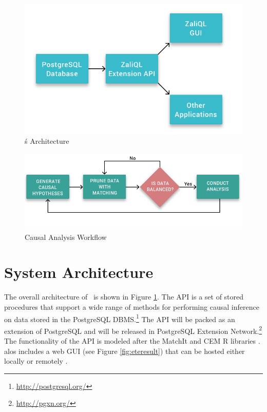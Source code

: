 
\begin{figure}
 \includegraphics[scale=0.25]{Figures/System-Overview.png}
 \caption{\GSQLB\'s Architecture}
  \label{fig:arch}
  \vspace{-3mm}
\end{figure}


\begin{figure}
  \includegraphics[scale=0.25]{Figures/Matching-Flowchart.png}
\caption{Causal Analysis Workflow}
\label{fig:flowchart}
\vspace{-0.3cm}
\end{figure}



\section{System Architecture}

The overall architecture of \GSQL\ is shown in Figure \ref{fig:arch}.
The API is a set of stored procedures that support a wide
range of methods for performing causal inference on data stored in the
PostgreSQL DBMS.\footnote{\url{http://postgresql.org/}}
The API will be packed  as an extension of  PostgreSQL and will be released in 
PostgreSQL Extension Network.\footnote{\url{http://pgxn.org/}}
The functionality of the API is modeled after the MatchIt and CEM R
libraries \cite{ho2005,iacus2009cem}. \GSQL alos includes a web GUI
(see Figure \ref{fig:eteresult}) that can be hosted either locally or
remotely . %


